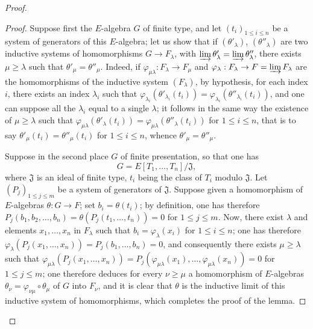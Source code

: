 \begin{proof}
\begin{proof}
Suppose first the $E$-algebra $G$ of finite type, and let $(t_i)_{1\leqslant i\leqslant n}$ be a system of generators of this $E$-algebra; let us show that if $(\theta'_\lambda)$, $(\theta''_\lambda)$ are two inductive systems of homomorphisms $G\to F_\lambda$, with $\varinjlim\theta'_\lambda=\varinjlim\theta''_\lambda$, there exists $\mu\geqslant\lambda$ such that $\theta'_\mu=\theta''_\mu$.
Indeed, if $\varphi_{\mu\lambda}:F_\lambda\to F_\mu$ and $\varphi_\lambda:F_\lambda\to F=\varinjlim F_\lambda$ are the homomorphisms of the inductive system $(F_\lambda)$, by hypothesis, for each index $i$, there exists an index $\lambda_i$ such that $\varphi_{\lambda_i}(\theta'_{\lambda_i}(t_i))=\varphi_{\lambda_i}(\theta''_{\lambda_i}(t_i))$, and one can suppose all the $\lambda_i$ equal to a single $\lambda$; it follows in the same way the existence of $\mu\geqslant\lambda$ such that $\varphi_{\mu\lambda}(\theta'_\lambda(t_i))=\varphi_{\mu\lambda}(\theta''_\lambda(t_i))$ for $1\leqslant i\leqslant n$, that is to say $\theta'_\mu(t_i)=\theta''_\mu(t_i)$ for $1\leqslant i\leqslant n$, whence $\theta'_\mu=\theta''_\mu$.

Suppose in the second place $G$ of finite presentation, so that one has
\[
  G=E[T_1,\ldots,T_n]/\mathfrak{J},
\]
where $\mathfrak{J}$ is an ideal of finite type, $t_i$ being the class of $T_i$ modulo $\mathfrak{J}$.
Let $(P_j)_{1\leqslant j\leqslant m}$ be a system of generators of $\mathfrak{J}$.
Suppose given a homomorphism of $E$-algebras $\theta:G\to F$; set $b_i=\theta(t_i)$; by definition, one has therefore $P_j(b_1,b_2,\ldots,b_n)=\theta(P_j(t_1,\ldots,t_n))=0$ for $1\leqslant j\leqslant m$.
Now, there exist $\lambda$ and elements $x_1,\ldots,x_n$ in $F_\lambda$ such that $b_i=\varphi_\lambda(x_i)$ for $1\leqslant i\leqslant n$; one has therefore $\varphi_\lambda(P_j(x_1,\ldots,x_n))=P_j(b_1,\ldots,b_n)=0$, and consequently there exists
$\mu\geqslant\lambda$ such that $\varphi_{\mu\lambda}(P_j(x_1,\ldots,x_n))=P_j(\varphi_{\mu\lambda}(x_1),\ldots,\varphi_{\mu\lambda}(x_n))=0$ for $1\leqslant j\leqslant m$; one therefore deduces for every $\nu\geqslant\mu$ a homomorphism of $E$-algebras $\theta_\nu=\varphi_{\nu\mu}\circ\theta_\mu$ of $G$ into $F_\nu$, and it is clear that $\theta$ is the inductive limit of this inductive system of homomorphisms, which completes the proof of the lemma.
\end{proof}


\end{proof}
